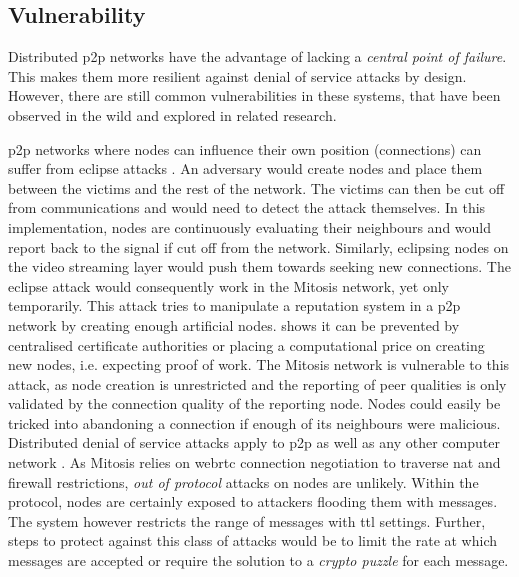 \subsection{Vulnerability}
Distributed \gls{p2p} networks have the advantage of lacking a \textit{central point of failure}. This makes them more resilient against denial of service attacks by design. However, there are still common vulnerabilities in these systems, that have been observed in the wild and explored in related research.
\begin{itemize}
     \gls{p2p} networks where nodes can influence their own position (connections) can suffer from eclipse attacks \cite[\S3]{s_kademlia}. An adversary would create nodes and place them between the victims and the rest of the network. The victims can then be cut off from communications and would need to detect the attack themselves. In this implementation, nodes are continuously evaluating their neighbours and would report back to the signal if cut off from the network. Similarly, eclipsing nodes on the video streaming layer would push them towards seeking new connections. The eclipse attack would consequently work in the Mitosis network, yet only temporarily.
     This attack tries to manipulate a reputation system in a \gls{p2p} network by creating enough artificial nodes. \citet[via BM08]{sybil-attack} shows it can be prevented by centralised certificate authorities or placing a computational price on creating new nodes, i.e. expecting proof of work. The Mitosis network is vulnerable to this attack, as node creation is unrestricted and the reporting of peer qualities is only validated by the connection quality of the reporting node. Nodes could easily be tricked into abandoning a connection if enough of its neighbours were malicious.
     Distributed denial of service attacks apply to \gls{p2p} as well as any other computer network \cite[\S2]{p2p-vulnerabilities}. As Mitosis relies on \gls{webrtc} connection negotiation to traverse \gls{nat} and firewall restrictions, \textit{out of protocol} attacks on nodes are unlikely. Within the protocol, nodes are certainly exposed to attackers flooding them with messages. The system however restricts the range of messages with \gls{ttl} settings. Further, steps to protect against this class of attacks would be to limit the rate at which messages are accepted or require the solution to a \textit{crypto puzzle} for each message.
\end{itemize}
